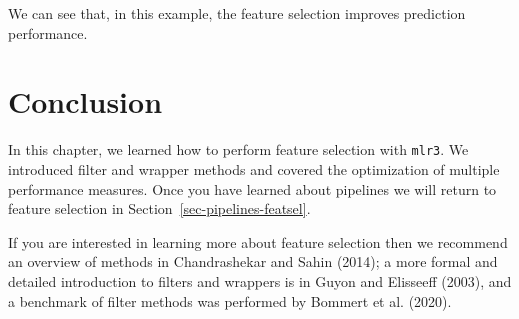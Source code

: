 We can see that, in this example, the feature selection improves
prediction performance.

\hypertarget{conclusion-4}{%
\section{Conclusion}\label{conclusion-4}}

In this chapter, we learned how to perform feature selection with
\texttt{mlr3}. We introduced filter and wrapper methods and covered the
optimization of multiple performance measures. Once you have learned
about pipelines we will return to feature selection in
Section~\ref{sec-pipelines-featsel}.

If you are interested in learning more about feature selection then we
recommend an overview of methods in Chandrashekar and Sahin (2014); a
more formal and detailed introduction to filters and wrappers is in
Guyon and Elisseeff (2003), and a benchmark of filter methods was
performed by Bommert et al. (2020).

